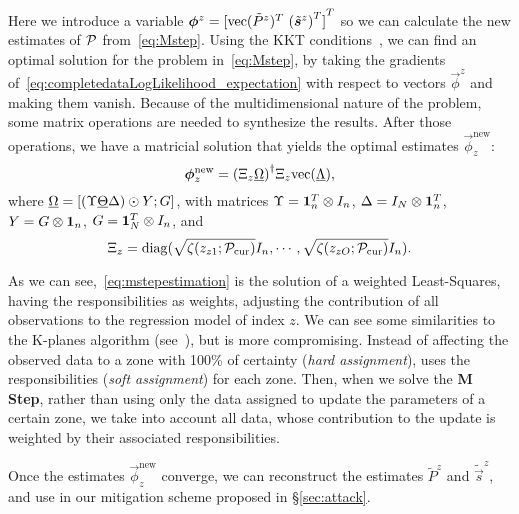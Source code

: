 \documentclass{ifacconf}  %
\begin{document}
Here we introduce a variable ${\vec{\phi}^{z}={[\vectorize{\tilde{P}^{z}}^{T}\ {(\tilde{\vec{s}}^{z})}^{T} ]}^{T}}$ so we can calculate the new estimates of $\mathcal{P}$ from~\eqref{eq:Mstep}. Using the KKT conditions~\cite{BoydVandenberghe2004}, we can find an optimal solution for the problem in~\eqref{eq:Mstep}, by
taking the gradients of~\eqref{eq:completedataLogLikelihood_expectation} with respect to vectors $\vec{\phi}^{z}$ and making them vanish.
Because of the multidimensional nature of the problem, some matrix operations are needed to synthesize the results.
After those operations, we have a matricial solution that yields the optimal estimates $\vec{\phi}_{z}^{\mathrm{new}}$:
\begin{equation}
  \label{eq:mstepestimation}
  \boldsymbol{\phi}_{z}^{\mathrm{new}}={(\Xi_{z}\underline{\Omega})}^{\dagger}\Xi_{z}\mathrm{vec} (\underline{\Lambda}),
\end{equation}
where
${\underline{\Omega}=[(\Upsilon \underline{\Theta}\Delta)\odot Y;G]}$,
with matrices
${\Upsilon=\mathbf{1}_{n}^{T}\otimes I_{n}}$,
${\Delta=I_{N}\otimes\mathbf{1}_{n}^{T}}$,
${Y=G\otimes\mathbf{1}_{n}}$,
${G=\mathbf{1}_{N}^{T}\otimes I_{n}}$,
and
\[{\Xi_{z}={\operatorname{diag}(\sqrt{{\zeta(z_{z1};\mathcal{P}_{\mathrm{cur}})}}I_{n},\cdots,\sqrt{{\zeta(z_{zO};\mathcal{P}_{\mathrm{cur}})}}I_{n})}}.\]

As we can see,~\eqref{eq:mstepestimation} is the solution of a weighted Least-Squares, having the responsibilities as weights, adjusting the contribution of all observations to the regression model of index $z$.
We can see some similarities to the K-planes algorithm (see~\cite{BradleyMangasarian2000}), but \EM{} is more compromising.
Instead of affecting the observed data to a zone with 100\% of certainty (\emph{hard assignment}), \EM{} uses the responsibilities (\emph{soft assignment}) for each zone.
Then, when we solve the \textbf{M Step}, rather than using only the data assigned to update the parameters of a certain zone, we take into account all data, whose contribution to the update is weighted by their associated responsibilities.


Once the estimates $\vec{\phi}_{z}^{\mathrm{new}}$ converge, we can reconstruct the estimates $\tilde{P}^{z}$ and $\tilde{\vec{s}}^{z}$, and use in our mitigation scheme proposed in \S\ref{sec:attack}.

\end{document}
